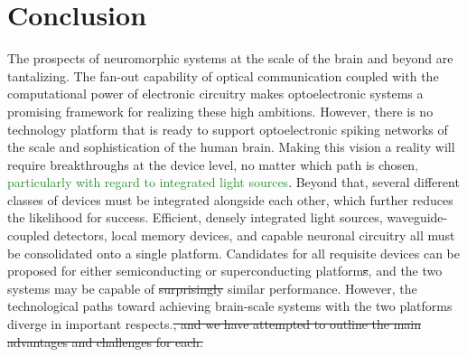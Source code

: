 \documentclass[twocolumn]{article}
\begin{document}
\section{\label{sec:conclusion}Conclusion}
The prospects of neuromorphic systems at the scale of the brain and beyond are tantalizing. The fan-out capability of optical communication coupled with the computational power of electronic circuitry makes optoelectronic systems a promising framework for realizing these high ambitions. However, there is no technology platform that is ready to support optoelectronic spiking networks of the scale and sophistication of the human brain. Making this vision a reality will require breakthroughs at the device level, no matter which path is chosen\textcolor{ForestGreen}{, particularly with regard to integrated light sources}. Beyond that, several different classes of devices must be integrated alongside each other, which further reduces the likelihood for success. Efficient, densely integrated light sources, waveguide-coupled detectors, local memory devices, and capable neuronal circuitry all must be consolidated onto a single platform. Candidates for all requisite devices can be proposed for either semiconducting or superconducting platform\sout{s}, and the two systems may be capable of \sout{surprisingly} similar performance. However, the technological paths toward achieving brain-scale systems with the two platforms diverge in important respects\textcolor{ForestGreen}{.}\sout{, and we have attempted to outline the main advantages and challenges for each.}
\end{document}

